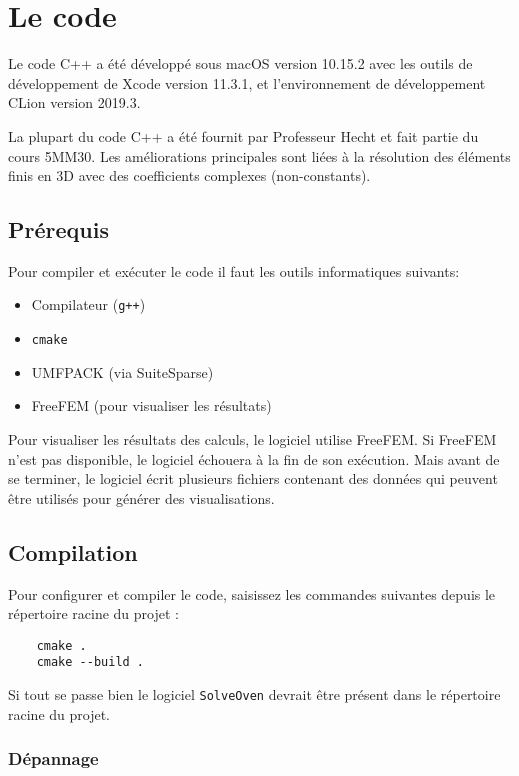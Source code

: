 \section{Le code}

Le code C++ a été développé sous macOS version 10.15.2 avec les outils
de développement de Xcode version 11.3.1, et l'environnement de
développement CLion version 2019.3.

La plupart du code C++ a été fournit par Professeur Hecht et fait partie
du cours 5MM30. Les améliorations principales sont liées à la résolution
des éléments finis en 3D avec des coefficients complexes (non-constants).

\subsection{Prérequis}

Pour compiler et exécuter le code il faut les outils informatiques
suivants:

\begin{itemize}
    \item Compilateur (\verb|g++|)
    \item \verb|cmake|
    \item UMFPACK (via SuiteSparse)
    \item FreeFEM (pour visualiser les résultats)
\end{itemize}

Pour visualiser les résultats des calculs, le logiciel utilise FreeFEM.
Si FreeFEM n'est pas disponible, le logiciel échouera à la fin de son
exécution. Mais avant de se terminer, le logiciel écrit plusieurs fichiers
contenant des données qui peuvent être utilisés pour générer des
visualisations.

\subsection{Compilation}

Pour configurer et compiler le code, saisissez les commandes suivantes
depuis le répertoire racine du projet :
\begin{verbatim}
    cmake .
    cmake --build .
\end{verbatim}

Si tout se passe bien le logiciel \verb|SolveOven| devrait être présent
dans le répertoire racine du projet.

\subsubsection{Dépannage}

